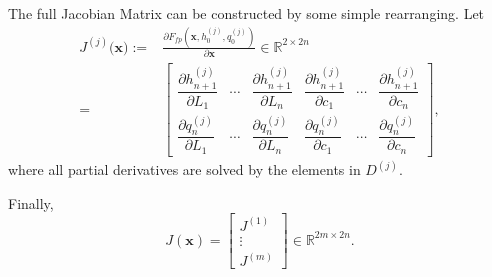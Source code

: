 \begin{algorithm}[ht]
\caption{Forward and Backwards Pass}
\label{alg:forward_backwards_pass}

\DontPrintSemicolon
{}
\end{algorithm}

The full Jacobian Matrix can be constructed by some simple rearranging. Let 
\begin{align*}
    J^{(j)}(\mathbf{x)} :=& \frac{\partial F_{fp}(\mathbf{x},h_0^{(j)},q_0^{(j)})}{\partial \mathbf{x}} \in \mathbb{R}^{2\times 2n}\\[0.2em]
    =& \begin{bmatrix}
    \dfrac{\partial h_{n+1}^{(j)}}{\partial L_1} & \cdots & \dfrac{\partial h_{n+1}^{(j)}}{\partial L_n} & 
    \dfrac{\partial h_{n+1}^{(j)}}{\partial c_1} & \cdots & \dfrac{\partial h_{n+1}^{(j)}}{\partial c_n} \\[0.8em]
    \dfrac{\partial q_n^{(j)}}{\partial L_1} & \cdots & \dfrac{\partial q_n^{(j)}}{\partial L_n} & 
    \dfrac{\partial q_n^{(j)}}{\partial c_1} & \cdots & \dfrac{\partial q_n^{(j)}}{\partial c_n}
    \end{bmatrix},
\end{align*}
where all partial derivatives are solved by the elements in $D^{(j)}$.

Finally,
\begin{equation}
\label{eq:jacobian}
    J(\mathbf{x}) = \begin{bmatrix}
        J^{(1)}\\
        \vdots\\
        J^{(m)}
    \end{bmatrix}
    \in \mathbb{R}^{2m\times2n}.
\end{equation}